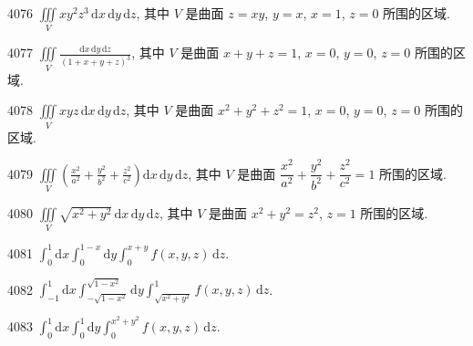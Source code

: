 

\begin{prob}[M]{4076}
$\displaystyle\iiint\limits_V xy^2 z^3\,\mathrm{d}x\,\mathrm{d}y\,\mathrm{d}z$, 其中 $V$ 是曲面 $z = xy$, $y = x$, $x = 1$, $z = 0$ 所围的区域.
\end{prob}

\begin{prob}[M]{4077}
$\displaystyle\iiint\limits_V \frac{\mathrm{d}x\,\mathrm{d}y\,\mathrm{d}z}{(1 + x + y + z)^3}$, 其中 $V$ 是曲面 $x + y + z = 1$, $x = 0$, $y = 0$, $z = 0$ 所围的区域.
\end{prob}

\begin{prob}[M]{4078}
$\displaystyle\iiint\limits_V xyz\,\mathrm{d}x\,\mathrm{d}y\,\mathrm{d}z$, 其中 $V$ 是曲面 $x^2 + y^2 + z^2 = 1$, $x = 0$, $y = 0$, $z = 0$ 所围的区域.
\end{prob}

\begin{prob}[M]{4079}
$\displaystyle\iiint\limits_V \left(\frac{x^2}{a^2} + \frac{y^2}{b^2} + \frac{z^2}{c^2}\right)\mathrm{d}x\,\mathrm{d}y\,\mathrm{d}z$, 其中 $V$ 是曲面 $\dfrac{x^2}{a^2} + \dfrac{y^2}{b^2} + \dfrac{z^2}{c^2} = 1$ 所围的区域.
\end{prob}

\begin{prob}[M]{4080}
$\displaystyle\iiint\limits_V \sqrt{x^2 + y^2}\,\mathrm{d}x\,\mathrm{d}y\,\mathrm{d}z$, 其中 $V$ 是曲面 $x^2 + y^2 = z^2$, $z = 1$ 所围的区域.
\end{prob}


\begin{prob}[S]{4081}
$\displaystyle\int_0^1 \mathrm{d}x \int_0^{1-x} \mathrm{d}y \int_0^{x+y} f(x,y,z)\,\mathrm{d}z$.
\end{prob}

\begin{prob}[S]{4082}
$\displaystyle\int_{-1}^1 \mathrm{d}x \int_{-\sqrt{1-x^2}}^{\sqrt{1-x^2}} \mathrm{d}y \int_{\sqrt{x^2+y^2}}^1 f(x,y,z)\,\mathrm{d}z$.
\end{prob}

\begin{prob}[S]{4083}
$\displaystyle\int_0^1 \mathrm{d}x \int_0^1 \mathrm{d}y \int_0^{x^2+y^2} f(x,y,z)\,\mathrm{d}z$.
\end{prob}

